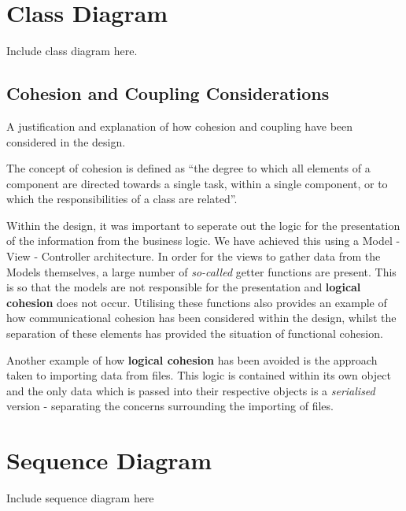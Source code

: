 \documentclass[
  english,
  a4paper,
,tablecaptionabove
]{scrartcl}
\begin{document}
\newpage

\hypertarget{class-diagram}{%
\section{Class Diagram}\label{class-diagram}}

Include class diagram here.

\hypertarget{cohesion-and-coupling-considerations}{%
\subsection{Cohesion and Coupling
Considerations}\label{cohesion-and-coupling-considerations}}

A justification and explanation of how cohesion and coupling have been
considered in the design.

The concept of cohesion is defined as \enquote{the degree to which all
elements of a component are directed towards a single task, within a
single component, or to which the responsibilities of a class are
related}.

Within the design, it was important to seperate out the logic for the
presentation of the information from the business logic. We have
achieved this using a Model - View - Controller architecture. In order
for the views to gather data from the Models themselves, a large number
of \emph{so-called} getter functions are present. This is so that the
models are not responsible for the presentation and \textbf{logical
cohesion} does not occur. Utilising these functions also provides an
example of how communicational cohesion has been considered within the
design, whilst the separation of these elements has provided the
situation of functional cohesion.

Another example of how \textbf{logical cohesion} has been avoided is the
approach taken to importing data from files. This logic is contained
within its own object and the only data which is passed into their
respective objects is a \emph{serialised} version - separating the
concerns surrounding the importing of files.

\newpage

\hypertarget{sequence-diagram}{%
\section{Sequence Diagram}\label{sequence-diagram}}

Include sequence diagram here
\end{document}
